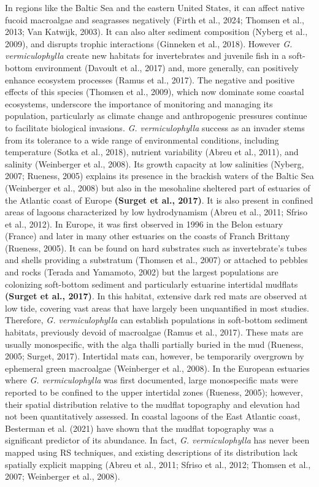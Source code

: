 \documentclass[
  letterpaper,
  11pt,
  english,
  singlespacing,
  headsepline]{MastersDoctoralThesis}
\begin{document}
\begin{spacing}{1.5}
In regions like the Baltic Sea and the eastern United States, it can
affect native fucoid macroalgae and seagrasses negatively (Firth et al.,
2024; Thomsen et al., 2013; Van Katwijk, 2003). It can also alter
sediment composition (Nyberg et al., 2009), and disrupts trophic
interactions (Ginneken et al., 2018). However \emph{G. vermiculophylla}
create new habitats for invertebrates and juvenile fish in a soft-bottom
environment (Davoult et al., 2017) and, more generally, can positively
enhance ecosystem processes (Ramus et al., 2017). The negative and
positive effects of this species (Thomsen et al., 2009), which now
dominate some coastal ecosystems, underscore the importance of
monitoring and managing its population, particularly as climate change
and anthropogenic pressures continue to facilitate biological invasions.
\emph{G. vermiculophylla} success as an invader stems from its tolerance
to a wide range of environmental conditions, including temperature
(Sotka et al., 2018), nutrient variability (Abreu et al., 2011), and
salinity (Weinberger et al., 2008). Its growth capacity at low
salinities (Nyberg, 2007; Rueness, 2005) explains its presence in the
brackish waters of the Baltic Sea (Weinberger et al., 2008) but also in
the mesohaline sheltered part of estuaries of the Atlantic coast of
Europe \textbf{(Surget et al., 2017)}. It is also present in confined
areas of lagoons characterized by low hydrodynamism (Abreu et al., 2011;
Sfriso et al., 2012). In Europe, it was first observed in 1996 in the
Belon estuary (France) and later in many other estuaries on the coasts
of Franch Brittany (Rueness, 2005). It can be found on hard substrates
such as invertebrate's tubes and shells providing a substratum (Thomsen
et al., 2007) or attached to pebbles and rocks (Terada and Yamamoto,
2002) but the largest populations are colonizing soft-bottom sediment
and particularly estuarine intertidal mudflats \textbf{(Surget et al.,
2017)}. In this habitat, extensive dark red mats are observed at low
tide, covering vast areas that have largely been unquantified in most
studies. Therefore, \emph{G. vermiculophylla} can establish populations
in soft-bottom sediment habitats, previously devoid of macroalgae (Ramus
et al., 2017). These mats are usually monospecific, with the alga thalli
partially buried in the mud (Rueness, 2005; Surget, 2017). Intertidal
mats can, however, be temporarily overgrown by ephemeral green
macroalgae (Weinberger et al., 2008). In the European estuaries where
\emph{G. vermiculophylla} was first documented, large monospecific mats
were reported to be confined to the upper intertidal zones (Rueness,
2005); however, their spatial distribution relative to the mudflat
topography and elevation had not been quantitatively assessed. In
coastal lagoons of the East Atlantic coast, Besterman et al. (2021) have
shown that the mudflat topography was a significant predictor of its
abundance. In fact, \emph{G. vermiculophylla} has never been mapped
using RS techniques, and existing descriptions of its distribution lack
spatially explicit mapping (Abreu et al., 2011; Sfriso et al., 2012;
Thomsen et al., 2007; Weinberger et al., 2008).


\end{spacing}
\end{document}
